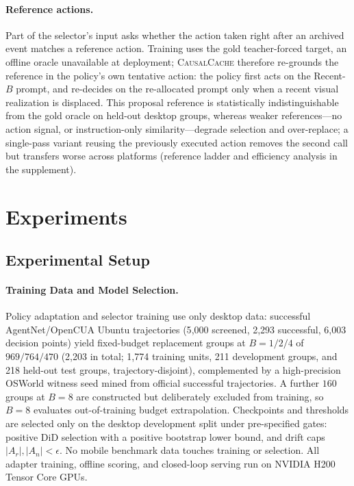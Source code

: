 \documentclass[letterpaper]{article} %
\newcommand{\method}{\textsc{CausalCache}}
\begin{document}
\paragraph{Reference actions.}
Part of the selector's input asks whether the action taken right after an
archived event matches a reference action. Training uses the gold
teacher-forced target, an offline oracle unavailable at deployment;
\method{} therefore re-grounds the reference in the policy's own tentative
action: the policy first acts on the Recent-$B$ prompt, and re-decides on
the re-allocated prompt only when a recent visual realization is
displaced. This proposal reference is statistically indistinguishable
from the gold oracle on held-out desktop groups, whereas weaker
references---no action signal, or instruction-only similarity---degrade
selection and over-replace; a single-pass variant reusing the previously
executed action removes the second call but transfers worse across
platforms (reference ladder and efficiency analysis in the supplement).

\section{Experiments}

\subsection{Experimental Setup}

\paragraph{Training Data and Model Selection.}

Policy adaptation and selector training use only desktop data: successful
AgentNet/OpenCUA Ubuntu trajectories (5{,}000 screened, 2{,}293 successful,
6{,}003 decision points) yield fixed-budget replacement groups at
$B{=}1/2/4$ of $969/764/470$ (2{,}203 in total; 1{,}774 training units, 211 development
groups, and 218 held-out test groups, trajectory-disjoint), complemented by a
high-precision OSWorld witness seed
mined from official successful trajectories. A further $160$ groups at
$B{=}8$ are constructed but deliberately excluded from training, so $B{=}8$
evaluates out-of-training budget extrapolation. Checkpoints and thresholds
are selected only on the desktop development split under pre-specified
gates: positive DiD selection with a positive bootstrap lower bound, and
drift caps $|A_r|,|A_n|<\epsilon$. No mobile benchmark data touches training
or selection. All adapter training, offline scoring, and closed-loop serving
run on NVIDIA H200 Tensor Core GPUs.
\end{document}
